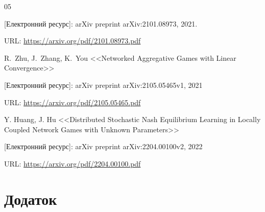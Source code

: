 \documentclass[a4paper]{article}
\begin{document}
\begin{thebibliography}{05}
{[Електронний ресурс]: arXiv preprint arXiv:2101.08973, 2021.

URL: \url{https://arxiv.org/pdf/2101.08973.pdf}

 R.~Zhu, J.~Zhang, K.~You <<Networked Aggregative Games with Linear Convergence>>

[Електронний ресурс]: arXiv preprint arXiv:2105.05465v1, 2021

URL: \url{https://arxiv.org/pdf/2105.05465.pdf}

\label{Article3} Y. Huang, J. Hu <<Distributed Stochastic Nash Equilibrium Learning in Locally Coupled Network Games with Unknown Parameters>>

[Електронний ресурс]: arXiv preprint arXiv:2204.00100v2, 2022

URL: \url{https://arxiv.org/pdf/2204.00100.pdf}
}
\end{thebibliography}

\clearpage
\section*{Додаток}
\end{document}
